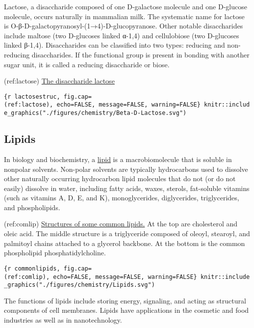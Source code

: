 Lactose, a disaccharide composed of one D-galactose molecule and one
D-glucose molecule, occurs naturally in mammalian milk. The systematic
name for lactose is O-β-D-galactopyranosyl-(1→4)-D-glucopyranose. Other
notable disaccharides include maltose (two D-glucoses linked α-1,4) and
cellulobiose (two D-glucoses linked β-1,4). Disaccharides can be
classified into two types: reducing and non-reducing disaccharides. If
the functional group is present in bonding with another sugar unit, it
is called a reducing disaccharide or biose.

(ref:lactose)
\href{https://commons.wikimedia.org/wiki/File:Beta-D-Lactose.svg}{The
disaccharide lactose}

\texttt{\{r\ lactosestruc,\ fig.cap=\textquotesingle{}(ref:lactose)\textquotesingle{},\ echo=FALSE,\ message=FALSE,\ warning=FALSE\}\ knitr::include\_graphics("./figures/chemistry/Beta-D-Lactose.svg")}

\hypertarget{lipids}{%
\subsection{Lipids}\label{lipids}}

In biology and biochemistry, a
\href{https://en.wikipedia.org/wiki/Lipid}{lipid} is a macrobiomolecule
that is soluble in nonpolar solvents. Non-polar solvents are typically
hydrocarbons used to dissolve other naturally occurring hydrocarbon
lipid molecules that do not (or do not easily) dissolve in water,
including fatty acids, waxes, sterols, fat-soluble vitamins (such as
vitamins A, D, E, and K), monoglycerides, diglycerides, triglycerides,
and phospholipids.

(ref:comlip)
\href{https://commons.wikimedia.org/wiki/File:Common_lipids_lmaps.png}{Structures
of some common lipids.} At the top are cholesterol and oleic acid. The
middle structure is a triglyceride composed of oleoyl, stearoyl, and
palmitoyl chains attached to a glycerol backbone. At the bottom is the
common phospholipid phosphatidylcholine.

\texttt{\{r\ commonlipids,\ fig.cap=\textquotesingle{}(ref:comlip)\textquotesingle{},\ echo=FALSE,\ message=FALSE,\ warning=FALSE\}\ knitr::include\_graphics("./figures/chemistry/Lipids.svg")}

The functions of lipids include storing energy, signaling, and acting as
structural components of cell membranes. Lipids have applications in the
cosmetic and food industries as well as in nanotechnology.


